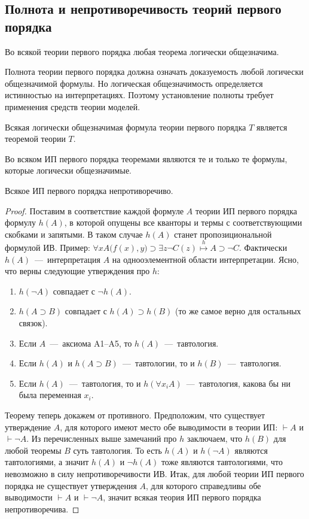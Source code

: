 \subsection{Полнота и непротиворечивость теорий первого порядка}
\begin{lemma}
    Во всякой теории первого порядка любая теорема логически общезначима.
\end{lemma}
Полнота теории первого порядка должна означать доказуемость любой логически общезначимой формулы. Но логическая общезначимость определяется истинностью на интерпретациях. Поэтому установление полноты требует применения средств теории моделей.
\begin{lemma}
    Всякая логически общезначимая формула теории первого порядка $T$ является теоремой теории $T$.
\end{lemma}
\begin{theorem}
    Во всяком ИП первого порядка теоремами являются те и только те формулы, которые логически общезначимые.
\end{theorem}
\begin{theorem}
    Всякое ИП первого порядка непротиворечиво.
\end{theorem}
\begin{proof}
    Поставим в соответствие каждой формуле $A$ теории ИП первого порядка формулу $h(A)$, в которой опущены все кванторы и термы с соответствующими скобками и запятыми. В таком случае $h(A)$ станет пропозициональной формулой ИВ. Пример: $\forall xA\big(f(x), y\big) \supset \exists z\neg C(z) \overset{h}{\longmapsto} A \supset \neg C$. Фактически $h(A)$~---~интерпретация $A$ на однооэлементной области интерпретации. Ясно, что верны следующие утверждения про $h$:
    \begin{enumerate}
        \item $h(\neg A)$ совпадает с $\neg h(A)$.
        \item $h(A \supset B)$ совпадает с $h(A) \supset h(B)$ (то же самое верно для остальных связок).
        \item Если $A$~---~аксиома A1--A5, то $h(A)$~---~тавтология.
        \item Если $h(A)$ и $h(A \supset B)$~---~тавтологии, то и $h(B)$~---~тавтология.
        \item Если $h(A)$~---~тавтология, то и $h(\forall x_iA)$~---~тавтология, какова бы ни была переменная $x_i$.
    \end{enumerate}
    Теорему теперь докажем от противного. Предположим, что существует утверждение $A$, для которого имеют место обе выводимости в теории ИП: $\vdash A$ и $\vdash \neg A$. Из перечисленных выше замечаний про $h$ заключаем, что $h(B)$ для любой теоремы $B$ суть тавтология. То есть $h(A)$ и $h(\neg A)$ являются тавтологиями, а значит $h(A)$ и $\neg h(A)$ тоже являются тавтологиями, что невозможно в силу непротиворечивости ИВ. Итак, для любой теории ИП первого порядка не существует утверждения $A$, для которого справедливы обе выводимости $\vdash A$ и $\vdash \neg A$, значит всякая теория ИП первого порядка непротиворечива.
\end{proof}